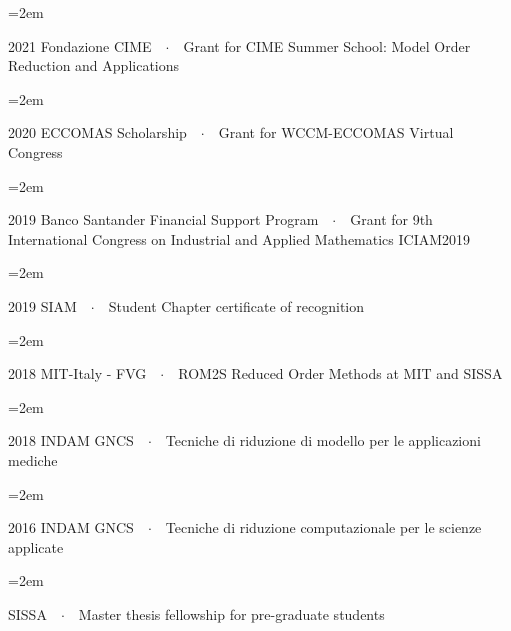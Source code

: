 \documentclass{scrartcl}
\newcommand{\Description}[1]{\hangindent=2em\hangafter=0\noindent\raggedright\footnotesize{#1}\par\normalsize\vspace{1em}} %
\begin{document}
\begin{cv}{}
\vspace{-0.5em} 

\Description{{\color{violet}2021 Fondazione CIME}\ \ $\cdotp$\ \  Grant for CIME Summer School: Model Order Reduction and Applications}

\vspace{-0.5em} %

\Description{{\color{violet}2020 ECCOMAS Scholarship}\ \ $\cdotp$\ \   Grant for WCCM-ECCOMAS Virtual Congress}

\vspace{-0.5em} %

\Description{{\color{violet}2019 Banco Santander Financial Support Program}\ \ $\cdotp$\ \   Grant for 9th International Congress on Industrial and Applied Mathematics ICIAM2019}

\vspace{-0.5em} %

\Description{{\color{violet}2019 SIAM}\ \ $\cdotp$\ \  Student Chapter certificate of recognition}

\vspace{-0.5em} %

\Description{{\color{violet}2018 MIT-Italy - FVG}\ \ $\cdotp$\ \  ROM2S Reduced Order Methods at MIT and SISSA}

\vspace{-0.5em} %

\Description{{\color{violet}2018 INDAM GNCS}\ \ $\cdotp$\ \  Tecniche di riduzione di modello per le applicazioni mediche}

\vspace{-0.5em} %
%
\Description{{\color{violet}2016 INDAM GNCS}\ \ $\cdotp$\ \  Tecniche di riduzione computazionale per le scienze applicate}

\vspace{-0.5em} %

\Description{{\color{violet}SISSA}\ \ $\cdotp$\ \ Master thesis fellowship for pre-graduate students}


\end{cv}
\end{document}
